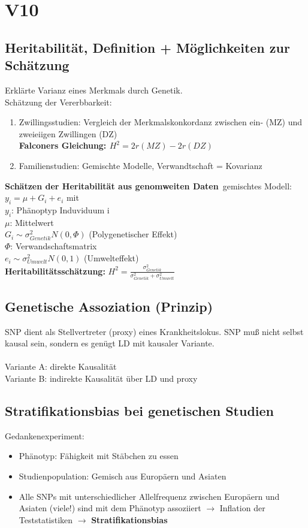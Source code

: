 \section{V10}
\subsection{Heritabilität, Definition + Möglichkeiten zur Schätzung}
Erklärte Varianz eines Merkmals durch Genetik.\\
Schätzung der Vererbbarkeit:
\begin{enumerate}
	\item Zwillingsstudien: Vergleich der Merkmalskonkordanz zwischen ein- (MZ) und zweieiigen Zwillingen (DZ)\\
	\textbf{Falconers Gleichung: $H^2=2r(MZ)-2r(DZ)$}
	\item Familienstudien: Gemischte Modelle, Verwandtschaft = Kovarianz
\end{enumerate}

\textbf{Schätzen der Heritabilität aus genomweiten Daten}\
gemischtes Modell: $y_i=\mu+G_i+e_i$ mit \\
$y_i$: Phänoptyp Induviduum i\\
$\mu$: Mittelwert\\
$G_i \sim \sigma^{2}_{Genetik}N(0,\Phi)$ (Polygenetischer Effekt)\\
$\Phi$: Verwandschaftsmatrix\\
$e_i \sim \sigma^{2}_{Umwelt}N(0,1)$ (Umwelteffekt)\\

\textbf{Heritabilitätsschätzung:} $H^2=\frac{\sigma^{2}_{Genetik}}{\sigma^{2}_{Genetik} + \sigma^{2}_{Umwelt}}$

\subsection{Genetische Assoziation (Prinzip)}
SNP dient als Stellvertreter (proxy) eines Krankheitslokus. SNP muß nicht selbst kausal sein, sondern es genügt LD mit kausaler Variante.\\\\
Variante A: direkte Kausalität\\
Variante B: indirekte Kausalität über LD und proxy

\subsection{Stratifikationsbias bei genetischen Studien}
Gedankenexperiment:
\begin{itemize}
	\item Phänotyp: Fähigkeit mit Stäbchen zu essen
	\item Studienpopulation: Gemisch aus Europäern und Asiaten
	\item Alle SNPs mit unterschiedlicher Allelfrequenz zwischen Europäern
und Asiaten (viele!) sind mit dem Phänotyp assoziiert $\rightarrow$ Inflation der
Teststatistiken $\rightarrow$ \textbf{Stratifikationsbias}
\end{itemize}

